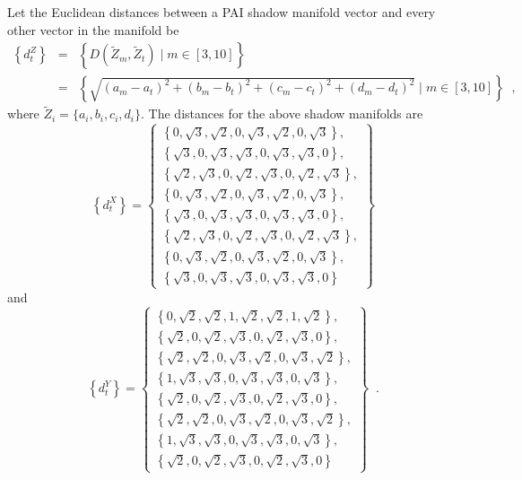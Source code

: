 Let the Euclidean distances between a PAI shadow manifold vector and every other vector in the manifold be 
\begin{eqnarray}
\left\{d_{t}^Z\right\} &=& \left\{D\left(\tilde{Z}_{m},\tilde{Z}_{t}\right)\;|\;m\in[3,10]\right\} \\
&=& \left\{\sqrt{(a_m- a_t)^2+(b_m- b_t)^2+(c_m- c_t)^2+(d_m -d_t)^2}\;|\;m\in[3,10]\right\}\;\;,
\end{eqnarray}
where $\tilde{Z}_i=\{a_i,b_i,c_i,d_i\}$.  The distances for the above shadow manifolds are
\begin{equation}
\left\{d_{t}^X\right\} = \left\{\begin{array}{c} 
\left\{0,\sqrt{3},\sqrt{2},0,\sqrt{3},\sqrt{2},0,\sqrt{3}\right\},\\
\left\{\sqrt{3},0,\sqrt{3},\sqrt{3},0,\sqrt{3},\sqrt{3},0\right\},\\
\left\{\sqrt{2},\sqrt{3},0,\sqrt{2},\sqrt{3},0,\sqrt{2},\sqrt{3}\right\},\\
\left\{0,\sqrt{3},\sqrt{2},0,\sqrt{3},\sqrt{2},0,\sqrt{3}\right\},\\
\left\{\sqrt{3},0,\sqrt{3},\sqrt{3},0,\sqrt{3},\sqrt{3},0\right\},\\
\left\{\sqrt{2},\sqrt{3},0,\sqrt{2},\sqrt{3},0,\sqrt{2},\sqrt{3}\right\},\\
\left\{0,\sqrt{3},\sqrt{2},0,\sqrt{3},\sqrt{2},0,\sqrt{3}\right\},\\
\left\{\sqrt{3},0,\sqrt{3},\sqrt{3},0,\sqrt{3},\sqrt{3},0\right\}
\end{array}\right\}
\end{equation}
and
\begin{equation}
\left\{d_{t}^Y\right\} = \left\{\begin{array}{c} 
\left\{0,\sqrt{2},\sqrt{2},1,\sqrt{2},\sqrt{2},1,\sqrt{2}\right\},\\
\left\{\sqrt{2},0,\sqrt{2},\sqrt{3},0,\sqrt{2},\sqrt{3},0\right\},\\
\left\{\sqrt{2},\sqrt{2},0,\sqrt{3},\sqrt{2},0,\sqrt{3},\sqrt{2}\right\},\\
\left\{1,\sqrt{3},\sqrt{3},0,\sqrt{3},\sqrt{3},0,\sqrt{3}\right\},\\
\left\{\sqrt{2},0,\sqrt{2},\sqrt{3},0,\sqrt{2},\sqrt{3},0\right\},\\
\left\{\sqrt{2},\sqrt{2},0,\sqrt{3},\sqrt{2},0,\sqrt{3},\sqrt{2}\right\},\\
\left\{1,\sqrt{3},\sqrt{3},0,\sqrt{3},\sqrt{3},0,\sqrt{3}\right\},\\
\left\{\sqrt{2},0,\sqrt{2},\sqrt{3},0,\sqrt{2},\sqrt{3},0\right\}
\end{array}\right\}\;\;.
\end{equation}
